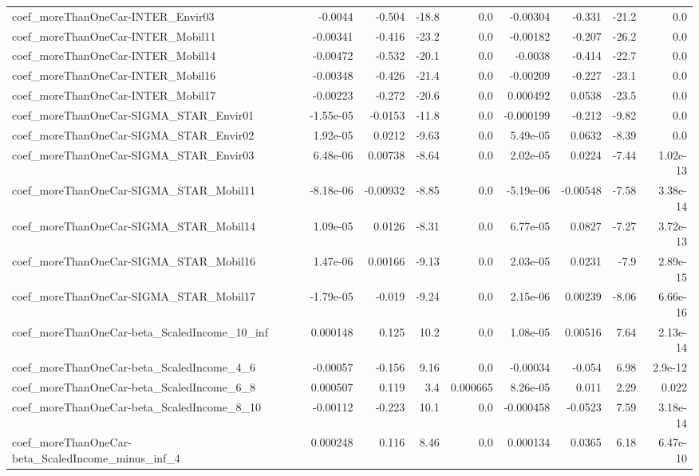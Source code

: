 \begin{tabular}{lrrrrrrrr}
coef_moreThanOneCar-INTER_Envir03 & -0.0044 & -0.504 & -18.8 & 0.0 & -0.00304 & -0.331 & -21.2 & 0.0 \\
coef_moreThanOneCar-INTER_Mobil11 & -0.00341 & -0.416 & -23.2 & 0.0 & -0.00182 & -0.207 & -26.2 & 0.0 \\
coef_moreThanOneCar-INTER_Mobil14 & -0.00472 & -0.532 & -20.1 & 0.0 & -0.0038 & -0.414 & -22.7 & 0.0 \\
coef_moreThanOneCar-INTER_Mobil16 & -0.00348 & -0.426 & -21.4 & 0.0 & -0.00209 & -0.227 & -23.1 & 0.0 \\
coef_moreThanOneCar-INTER_Mobil17 & -0.00223 & -0.272 & -20.6 & 0.0 & 0.000492 & 0.0538 & -23.5 & 0.0 \\
coef_moreThanOneCar-SIGMA_STAR_Envir01 & -1.55e-05 & -0.0153 & -11.8 & 0.0 & -0.000199 & -0.212 & -9.82 & 0.0 \\
coef_moreThanOneCar-SIGMA_STAR_Envir02 & 1.92e-05 & 0.0212 & -9.63 & 0.0 & 5.49e-05 & 0.0632 & -8.39 & 0.0 \\
coef_moreThanOneCar-SIGMA_STAR_Envir03 & 6.48e-06 & 0.00738 & -8.64 & 0.0 & 2.02e-05 & 0.0224 & -7.44 & 1.02e-13 \\
coef_moreThanOneCar-SIGMA_STAR_Mobil11 & -8.18e-06 & -0.00932 & -8.85 & 0.0 & -5.19e-06 & -0.00548 & -7.58 & 3.38e-14 \\
coef_moreThanOneCar-SIGMA_STAR_Mobil14 & 1.09e-05 & 0.0126 & -8.31 & 0.0 & 6.77e-05 & 0.0827 & -7.27 & 3.72e-13 \\
coef_moreThanOneCar-SIGMA_STAR_Mobil16 & 1.47e-06 & 0.00166 & -9.13 & 0.0 & 2.03e-05 & 0.0231 & -7.9 & 2.89e-15 \\
coef_moreThanOneCar-SIGMA_STAR_Mobil17 & -1.79e-05 & -0.019 & -9.24 & 0.0 & 2.15e-06 & 0.00239 & -8.06 & 6.66e-16 \\
coef_moreThanOneCar-beta_ScaledIncome_10_inf & 0.000148 & 0.125 & 10.2 & 0.0 & 1.08e-05 & 0.00516 & 7.64 & 2.13e-14 \\
coef_moreThanOneCar-beta_ScaledIncome_4_6 & -0.00057 & -0.156 & 9.16 & 0.0 & -0.00034 & -0.054 & 6.98 & 2.9e-12 \\
coef_moreThanOneCar-beta_ScaledIncome_6_8 & 0.000507 & 0.119 & 3.4 & 0.000665 & 8.26e-05 & 0.011 & 2.29 & 0.022 \\
coef_moreThanOneCar-beta_ScaledIncome_8_10 & -0.00112 & -0.223 & 10.1 & 0.0 & -0.000458 & -0.0523 & 7.59 & 3.18e-14 \\
coef_moreThanOneCar-beta_ScaledIncome_minus_inf_4 & 0.000248 & 0.116 & 8.46 & 0.0 & 0.000134 & 0.0365 & 6.18 & 6.47e-10 \\

\end{tabular}
